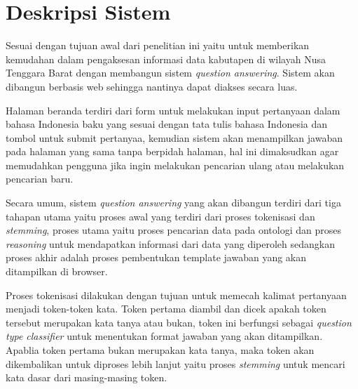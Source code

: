 \section{Deskripsi Sistem}
Sesuai dengan tujuan awal dari penelitian ini yaitu untuk memberikan kemudahan dalam pengaksesan informasi data kabutapen di wilayah Nusa Tenggara Barat dengan membangun sistem \emph{question answering}. Sistem akan dibangun berbasis web sehingga nantinya dapat diakses secara luas. 

Halaman beranda terdiri dari form untuk melakukan input pertanyaan dalam bahasa Indonesia baku yang sesuai dengan tata tulis bahasa Indonesia dan tombol untuk submit pertanyaa, kemudian sistem akan menampilkan jawaban pada halaman yang sama tanpa berpidah halaman, hal ini dimaksudkan agar memudahkan pengguna jika ingin melakukan pencarian ulang atau melakukan pencarian baru.

Secara umum, sistem \emph{question answering} yang akan dibangun terdiri dari tiga tahapan utama yaitu proses awal yang terdiri dari proses tokenisasi dan \emph{stemming}, proses utama yaitu proses pencarian data pada ontologi dan proses \emph{reasoning} untuk mendapatkan informasi dari data yang diperoleh sedangkan proses akhir adalah proses pembentukan template jawaban yang akan ditampilkan di browser.

Proses tokenisasi dilakukan dengan tujuan untuk memecah kalimat pertanyaan menjadi token-token kata. Token pertama diambil dan dicek apakah token tersebut merupakan kata tanya atau bukan, token ini berfungsi sebagai \emph{question type classifier} untuk menentukan format jawaban yang akan ditampilkan. Apablia token pertama bukan merupakan kata tanya, maka token akan dikembalikan untuk diproses lebih lanjut yaitu proses \emph{stemming} untuk mencari kata dasar dari masing-masing token.